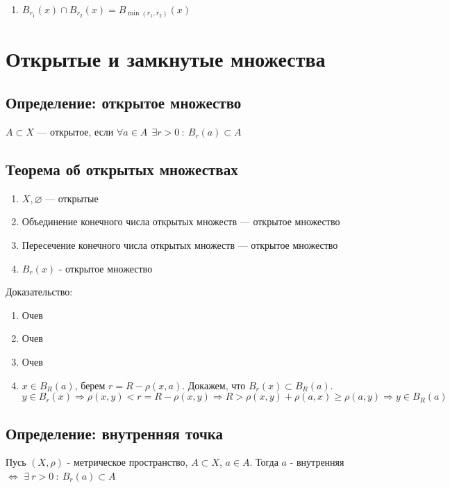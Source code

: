 \documentclass[12pt]{report} %
\begin{document}
\begin{enumerate}
\item $B_{r_1}(x) \cap B_{r_2}(x) = B_{\min(r_1, r_2)}(x)$
\end{enumerate}

\section*{Открытые и замкнутые множества}


\subsection*{Определение: открытое множество}
$A \subset X$ --- открытое, если $\forall a \in A \ \ \exists r > 0 \ : \ B_r(a) \subset A$
\subsection*{Теорема об открытых множествах}
\begin{enumerate}
\item $X, \varnothing$ --- открытые
\item Объединение конечного числа открытых множеств --- открытое множество
\item Пересечение конечного числа открытых множеств --- открытое множество
\item $B_r(x)$ - открытое множество
\end{enumerate}

Доказательство:\\
\begin{enumerate}
\item Очев
\item Очев
\item Очев
\item $x \in B_R(a)$, берем $r = R - \rho(x, a)$. Докажем, что $B_r(x) \subset B_R(a)$. $y \in B_r(x) \Rightarrow \rho(x, y) < r = R - \rho(x, y) \Rightarrow R > \rho(x, y) + \rho(a, x) \geqslant \rho(a, y) \Rightarrow y \in B_R(a)$ 
\end{enumerate}

\subsection*{Определение: внутренняя точка}
Пусь $(X, \rho)$ - метрическое пространство, $A \subset X$, $a \in A$. Тогда $a$ - внутренняя $\Leftrightarrow$ $\exists \ r > 0 \ : \ B_r(a) \subset A$
\end{document}
